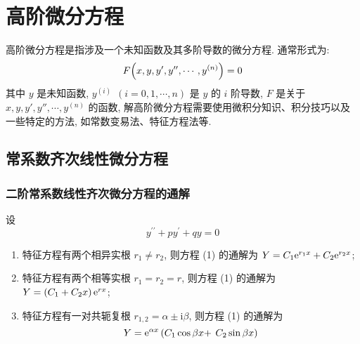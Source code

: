 \section{高阶微分方程}

高阶微分方程是指涉及一个未知函数及其多阶导数的微分方程. 通常形式为:
$$F\qty(x,y,y',y'',\cdots,y^{(n)})=0$$
其中 $y$ 是未知函数, $y^{(i)}~~(i=0,1,\cdots,n)$ 是 $y$ 的 $i$ 阶导数,
$F$ 是关于 $x,y,y',y'',\cdots,y^{(n)}$ 的函数, 解高阶微分方程需要使用微积分知识、积分技巧以及一些特定的方法, 如常数变易法、特征方程法等.

\subsection{常系数齐次线性微分方程}

\subsubsection{二阶常系数线性齐次微分方程的通解}

\begin{theorem}[二阶常系数线性齐次微分方程的通解结构]
    设
    \begin{equation*}
        y^{\prime \prime}+p y^{\prime}+q y=0
        \tag{1}
    \end{equation*}
    \begin{enumerate}[label=(\arabic{*})]
        \item 特征方程有两个相异实根 $ r_{1} \neq r_{2}$, 则方程 (1) 的通解为 $ Y=C_{1} \mathrm{e}^{r_{1} x}+C_{2} \mathrm{e}^{r_{2} x} $;
        \item 特征方程有两个相等实根 $ r_{1}=r_{2}=r $, 则方程 (1) 的通解为 $ Y=\left(C_{1}+C_{2} x\right) \mathrm{e}^{r x} $;
        \item 特征方程有一对共轭复根 $ r_{1,2}=\alpha \pm \mathrm{i} \beta $, 则方程 (1) 的通解为
              $$Y=\mathrm{e}^{\alpha x}\left(C_{1} \cos \beta x+\right.   \left.C_{2} \sin \beta x\right) $$
    \end{enumerate}
\end{theorem}

